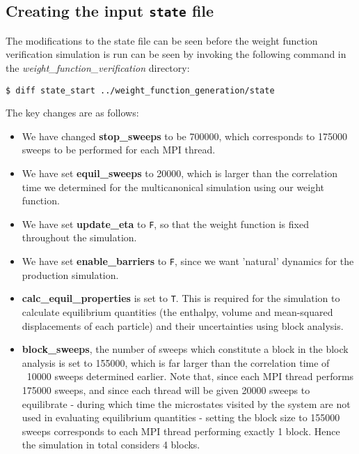 \documentclass{report}
\begin{document}
\subsection{Creating the input \texttt{state} file}
The modifications to the state file can be seen before the weight function verification simulation is run can be seen by invoking the following command
in the \emph{weight\_function\_verification} directory:
\begin{verbatim}
$ diff state_start ../weight_function_generation/state
\end{verbatim}
The key changes are as follows:
\begin{itemize}
\item We have changed \textbf{stop\_sweeps} to be 700000, which corresponds to 175000 sweeps to be performed for each MPI thread.
\item We have set \textbf{equil\_sweeps} to 20000, which is larger than the correlation time we determined for the multicanonical simulation using our 
weight function.
\item We have set \textbf{update\_eta} to \texttt{F}, so that the weight function is fixed throughout the simulation.
\item We have set \textbf{enable\_barriers} to \texttt{F}, since we want 'natural' dynamics for the production simulation.
\item \textbf{calc\_equil\_properties} is set to \texttt{T}. This is required for the simulation to calculate equilibrium quantities (the enthalpy, volume and 
mean-squared displacements of each particle) and their uncertainties using block analysis.
\item \textbf{block\_sweeps}, the number of sweeps which constitute a block in the block analysis is set to 155000, which is far larger than the 
correlation time of
  ~10000 sweeps determined earlier. Note that, since each MPI thread performs 175000 sweeps, and since each thread will be given 20000 sweeps to 
  equilibrate - during which time the microstates visited by the system are not used in evaluating equilibrium quantities - setting the block size to 
  155000 sweeps corresponds to each MPI thread performing exactly 1 block. Hence the simulation in total considers 4 blocks.
\end{itemize}
\end{document}
